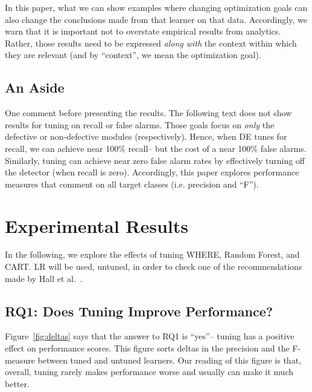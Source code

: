 \documentclass[smallextended]{svjour3}
\newcommand{\fig}[1]{Figure~\ref{fig:#1}}
\begin{document}
In this paper, what we can  show  examples where  changing  optimization goals can also change 
the conclusions made from that learner on that data. Accordingly, we warn that it is 
important not to overstate  empirical results from  analytics.
Rather, those results need to be expressed {\em along with} the context within which they are
relevant (and by ``context'', we mean the optimization goal).



\subsection{An Aside}

One comment before presenting the results. The following text does not
show results for tuning on recall
or false alarms. Those goals focus on {\em only}
the  defective or non-defective modules (respectively). Hence,
when DE tunes for recall, we can achieve near
100\% recall-- but the cost of a near 100\% false alarms.
Similarly,  tuning
can achieve near zero false alarm rates by effectively turning off
the detector (when recall is zero).
Accordingly,  this paper  explores performance measures that comment on all 
target classes (i.e. precision and ``F''). 




\section{Experimental Results}

In the following, we explore the effects of tuning WHERE, Random Forest,
and CART. LR will be used, untuned, in order to check one of the recommendations
made by Hall et al.~\cite{hall11}.

\subsection{RQ1:  Does  Tuning  Improve Performance? }\label{sect:precision}


\fig{deltas} says  that the answer to RQ1 is ``yes''-- tuning  has a positive effect on performance scores. This figure sorts
 deltas in the precision and the F-measure    between tuned and untuned learners. Our reading of this
figure is that, overall, tuning rarely makes performance   worse and usually can make it much better. 
 
\end{document}
